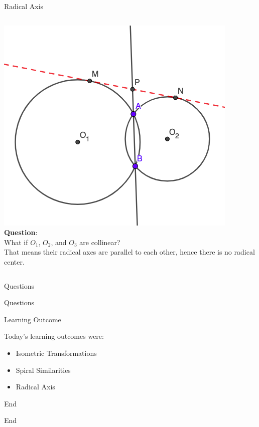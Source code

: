 \documentclass{beamer}
\begin{document}
\begin{frame}{Radical Axis}
	\begin{columns}
		\includegraphics[scale=0.4]{rad3.png}
		\textbf{Question}:\\
		What if $O_1$, $O_2$, and $O_3$ are collinear?\\
		\phantom{Spacing}
		That means their radical axes are parallel to each other,
		hence there is no radical center.
	\end{columns}
\end{frame}

\begin{frame}{Questions}
	\huge{\centerline{Questions}}
\end{frame}
\begin{frame}{Learning Outcome}
	\Large{Today's learning outcomes were:\\
	\phantom{Spacing}
	\begin{itemize}
		\setlength\itemsep{30pt}
		\item Isometric Transformations
		\item Spiral Similarities
		\item Radical Axis
	\end{itemize}
	}
\end{frame}
\begin{frame}{End}
\end{frame}
\begin{frame}{End}
\end{frame}
\end{document}
